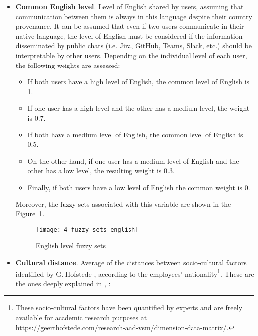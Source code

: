 \begin{itemize}
\item \textbf{Common English level}. Level of English shared by users, assuming that communication between them is always in this language despite their country provenance. It can be assumed that even if two users communicate in their native language, the level of English must be considered if the information disseminated by public chats (i.e. Jira, GitHub, Teams, Slack, etc.) should be interpretable by other users. Depending on the individual level of each user, the following weights are assessed:\newline

	\begin{itemize}
	\item If both users have a high level of English, the common level of English is 1.
	\item If one user has a high level and the other has a medium level, the weight is 0.7.
	\item If both have a medium level of English, the common level of English is 0.5.
	\item On the other hand, if one user has a medium level of English and the other has a low level, the resulting weight is 0.3.
	\item Finally, if both users have a low level of English the common weight is 0.\newline
	\end{itemize} 
	
	Moreover, the fuzzy sets associated with this variable are shown in the Figure~\ref{fig:fs-english}.\newline
	
	\begin{figure}
		\centering
		\texttt{[image: 4\_fuzzy-sets-english]}
		\caption[English level fuzzy sets]{English level fuzzy sets}
		\label{fig:fs-english}
	\end{figure}

\item \textbf{Cultural distance}. Average of the distances between socio-cultural factors identified by G. Hofstede \cite{hofstede_cultures_2004}, according to the employees’ nationality\footnote{These socio-cultural factors have been quantified by experts and are freely available for academic research purposes at \url{https://geerthofstede.com/research-and-vsm/dimension-data-matrix/}.}. These are the ones deeply explained in \cite{hofstede_dimensions}, \cite{hofstede_compare}:\newline


\end{itemize}
